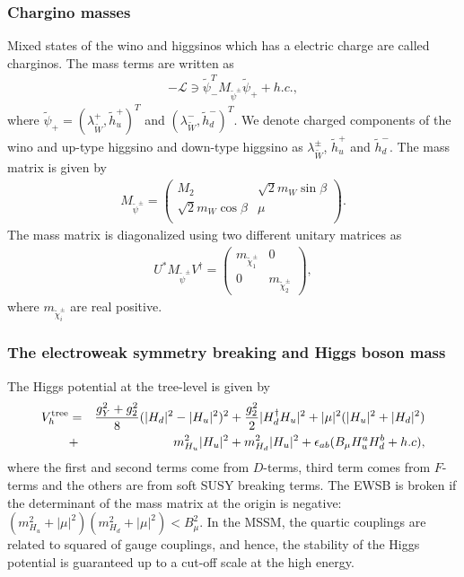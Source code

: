\documentclass[preprint,3p,12pt]{elsarticle}
\begin{document}
{\subsubsection{Chargino masses}
Mixed states of the wino and higgsinos which has a electric charge are called charginos. 
The mass terms are written as
\begin{eqnarray}
-\mathcal{L} \ni \tilde \psi_{-}^T M_{\tilde \psi^{\pm}} \tilde \psi_{+} + h.c.,
\end{eqnarray}
where $\tilde \psi_{+} = (\lambda_{\tilde W}^+, \tilde h_u^+)^T$ and $(\lambda_{\tilde W}^-, \tilde h_d^-)^T$. We denote charged components of the wino and up-type higgsino and down-type higgsino as $\lambda_{\tilde W}^{\pm}$, $\tilde h_u^+$ and $\tilde h_d^-$. The mass matrix is given by 
\begin{eqnarray}
M_{\tilde \psi^{\pm}}=
\left(
\begin{array}{cc}
M_2  &  \sqrt{2} m_W \sin\beta    \\
 \sqrt{2} m_W \cos\beta  &  \mu    \\
\end{array}
\right).
\end{eqnarray}
The mass matrix is diagonalized using two different  unitary matrices as
\begin{eqnarray}
U^* M_{\tilde \psi^{\pm}} V^\dag = \left(
\begin{array}{cc}
m_{{\tilde \chi}_1^\pm}  &  0  \\
  0 &   m_{{\tilde \chi}_2^\pm}
\end{array}
\right),
\end{eqnarray}
where $m_{{\tilde \chi}_i^\pm}$ are real positive.


\subsubsection{The electroweak symmetry breaking and Higgs boson mass}
The Higgs potential at the tree-level is given by
\begin{eqnarray}
V_{h}^{\rm tree} &=& \frac{g_Y^2 + g_2^2}{8}(|H_d|^2 - |H_u|^2)^2 + \frac{g_2^2}{2} |H_d^\dag H_u|^2 
+ |\mu|^2 ( |H_u|^2 + |H_d|^2) \nonumber \\
&+& m_{H_u}^2 |H_u|^2 + m_{H_d}^2 |H_u|^2 + \epsilon_{ab} (B_\mu H_u^a H_d^b + h.c),
\end{eqnarray}
where the first and second terms come from $D$-terms, third term comes from $F$-terms and the others are from soft SUSY breaking terms. The EWSB is broken if the determinant of the mass matrix at the origin is negative: $(m_{H_u}^2 + |\mu|^2)(m_{H_d}^2 + |\mu|^2) < B_\mu^2$. 
In the MSSM, the quartic couplings are related to squared of gauge couplings, and hence, the stability of the Higgs potential is guaranteed up to a cut-off scale at the high energy. 

}
\end{document}
